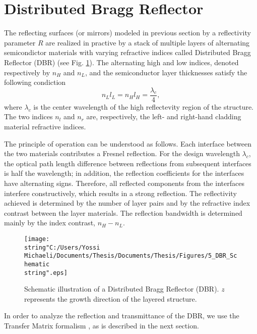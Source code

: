 \section{Distributed Bragg Reflector}

The reflecting surfaces (or mirrors) modeled in previous section by
a reflectivity parameter $R$ are realized in practive by a stack
of multiple layers of alternating semicondictor materials with varying
refractive indices called Distributed Bragg Reflector (DBR) (see Fig.
\ref{fig:Schematic-DBR}). The alternating high and low indices, denoted
respectively by $n_{H}$ and $n_{L}$, and the semiconductor layer
thicknesses satisfy the following condiction\begin{equation}
n_{L}l_{L}=n_{H}l_{H}=\frac{\lambda_{c}}{4},\end{equation}
where $\lambda_{c}$ is the center wavelength of the high reflectevity
region of the structure. The two indices $n_{l}$ and $n_{r}$ are,
respectively, the left- and right-hand cladding material refractive
indices.

The principle of operation can be understood as follows. Each interface
between the two materials contributes a Fresnel reflection. For the
design wavelength $\lambda_{c}$, the optical path length difference
between reflections from subsequent interfaces is half the wavelength;
in addition, the reflection coefficients for the interfaces have alternating
signs. Therefore, all reflected components from the interfaces interfere
constructively, which results in a strong reflection. The reflectivity
achieved is determined by the number of layer pairs and by the refractive
index contrast between the layer materials. The reflection bandwidth
is determined mainly by the index contrast, $n_{H}-n_{L}$.

%
\begin{figure}
\begin{centering}
\texttt{[image: \\string"C:/Users/Yossi Michaeli/Documents/Thesis/Documents/Thesis/Figures/5\_DBR\_Schematic\\string".eps]}
\par\end{centering}

\caption{\label{fig:Schematic-DBR}Schematic illustration of a Distributed
Bragg Reflector (DBR). $z$ represents the growth direction of the
layered structure.}

\end{figure}


In order to analyze the reflection and transmittance of the DBR, we
use the Transfer Matrix formalism \citet{Macleod2001}, as is described
in the next section.


